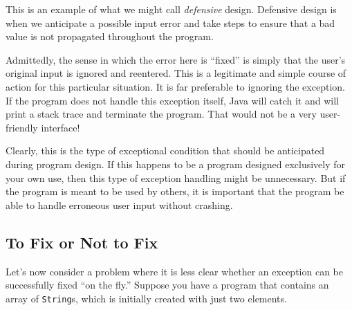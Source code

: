 \begin{figure}[tb]
\end{figure}


This is an example of what we might call {\em defensive} design.
Defensive design is when we anticipate a possible
input error and take steps to ensure that a bad value is not
propagated throughout the program.



Admittedly, the sense in which the error here is ``fixed'' is simply
that the user's original input is ignored and reentered.  This is a
legitimate and simple course of action for this particular
situation.  It is far preferable to ignoring the exception.  If the
program does not handle this exception itself, Java will catch it and
will print a stack trace and terminate the program.  That would not be
a very user-friendly interface!

Clearly, this is the type of exceptional condition that should be
anticipated during program design.  If this happens to be a program
designed exclusively for your own use, then this type of
exception handling might be unnecessary.  But if the program is meant to
be used by others, it is important that the program be able to handle
erroneous user input without crashing.



\subsection{To Fix or Not to Fix}
\noindent Let's now consider a problem where it is less clear whether an
exception can be successfully fixed ``on the fly.''  Suppose you have
a program that contains an array of {\tt String}s, which is initially
created with just two elements.


